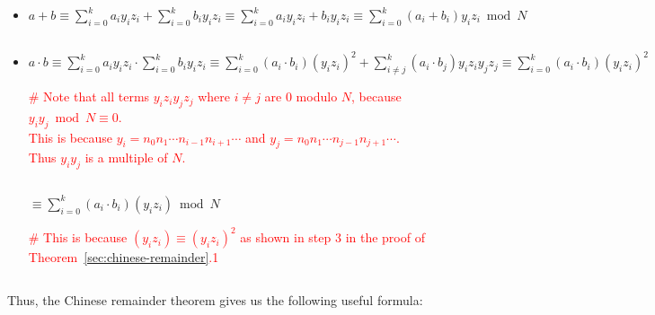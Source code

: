\begin{itemize}
\item $a + b  \equiv \sum\limits_{i=0}^k a_i y_i z_i + \sum\limits_{i=0}^k b_i y_i z_i \equiv \sum\limits_{i=0}^k a_i y_i z_i + b_i y_i z_i \equiv 
 \sum\limits_{i=0}^k (a_i + b_i) y_i z_i \bmod N $

$ $

\item $a \cdot b \equiv \sum\limits_{i=0}^k a_i y_i z_i \cdot \sum\limits_{i=0}^k b_i y_i z_i \equiv \sum\limits_{i=0}^k (a_i \cdot b_i) (y_i z_i)^2  + \sum\limits_{i\neq j}^k (a_i \cdot b_j) y_i z_iy_j z_j \equiv \sum\limits_{i=0}^k (a_i \cdot b_i) (y_i z_i)^2$

\textcolor{red}{\# Note that all terms $y_iz_iy_jz_j$ where $i \neq j$ are 0 modulo $N$, because $y_iy_j \bmod N \equiv 0$. \\
This is because $y_i = n_0n_1\cdots n_{i-1}n_{i+1}\cdots$ and $y_j = n_0n_1\cdots n_{j-1}n_{j+1}\cdots$. \\
Thus $y_iy_j$ is a multiple of $N$.}

$ $

$\equiv \sum\limits_{i=0}^k (a_i \cdot b_i) (y_i z_i) \bmod N$

\textcolor{red}{\# This is because $(y_i z_i) \equiv (y_i z_i)^2$ as shown in step 3 in the proof of Theorem~\ref*{sec:chinese-remainder}.1}


\end{itemize}

$ $

Thus, the Chinese remainder theorem gives us the following useful formula: 

